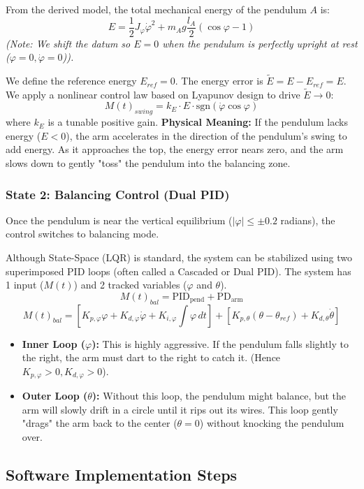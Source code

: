 \documentclass[12pt]{article}
\begin{document}
From the derived model, the total mechanical energy of the pendulum $A$ is:
$$ E = \frac{1}{2} J{}_\varphi \dot{\varphi}^2 + m{}_A g \frac{l{}_A}{2} (\cos\varphi - 1) $$
\textit{(Note: We shift the datum so $E=0$ when the pendulum is perfectly upright at rest ($\varphi=0, \dot{\varphi}=0$)).}

We define the reference energy $E_{ref} = 0$. The energy error is $\tilde{E} = E - E_{ref} = E$. We apply a nonlinear control law based on Lyapunov design to drive $\tilde{E} \to 0$:
$$ M(t)_{swing} = k_E \cdot E \cdot \text{sgn}(\dot{\varphi}\cos\varphi) $$
where $k_E$ is a tunable positive gain. 
\textbf{Physical Meaning:} If the pendulum lacks energy ($E < 0$), the arm accelerates in the direction of the pendulum's swing to add energy. As it approaches the top, the energy error nears zero, and the arm slows down to gently "toss" the pendulum into the balancing zone.

\subsubsection{State 2: Balancing Control (Dual PID)}
Once the pendulum is near the vertical equilibrium ($|\varphi| \le \pm 0.2$ radians), the control switches to balancing mode. 

Although State-Space (LQR) is standard, the system can be stabilized using two superimposed PID loops (often called a Cascaded or Dual PID). The system has 1 input ($M(t)$) and 2 tracked variables ($\varphi$ and $\theta$).
$$ M(t)_{bal} = \text{PID}_{\text{pend}} + \text{PD}_{\text{arm}} $$
$$ M(t)_{bal} = \left[ K_{p,\varphi} \varphi + K_{d,\varphi} \dot{\varphi} + K_{i,\varphi} \int \varphi \, dt \right] + \left[ K_{p,\theta} (\theta - \theta_{ref}) + K_{d,\theta} \dot{\theta} \right] $$

\begin{itemize}
    \item \textbf{Inner Loop ($\varphi$):} This is highly aggressive. If the pendulum falls slightly to the right, the arm must dart to the right to catch it. (Hence $K_{p,\varphi} > 0, K_{d,\varphi} > 0$).
    \item \textbf{Outer Loop ($\theta$):} Without this loop, the pendulum might balance, but the arm will slowly drift in a circle until it rips out its wires. This loop gently "drags" the arm back to the center ($\theta=0$) without knocking the pendulum over.
\end{itemize}

\subsection{Software Implementation Steps}
\end{document}
